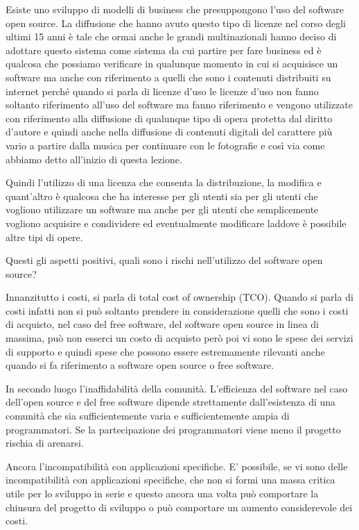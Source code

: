 Esiste uno sviluppo di modelli di business che presuppongono l'uso del software open source. 
La diffusione che hanno avuto questo tipo di licenze nel corso degli ultimi 15 anni è tale che ormai anche le grandi multinazionali hanno deciso di adottare questo sistema come sistema da cui partire per fare business ed è qualcosa che possiamo verificare in qualunque momento in cui si acquisisce un software ma anche con riferimento a quelli che sono i contenuti distribuiti su internet perché quando si parla di licenze d'uso le licenze d'uso non fanno soltanto riferimento all'uso del software ma fanno riferimento e vengono utilizzate con riferimento alla diffusione di qualunque tipo di opera protetta dal diritto d'autore e quindi anche nella diffusione di contenuti digitali del carattere più vario a partire dalla musica per continuare con le fotografie e così via come abbiamo detto all'inizio di questa lezione. 

Quindi l'utilizzo di una licenza che consenta la distribuzione, la modifica e quant'altro è qualcosa che ha interesse per gli utenti sia per gli utenti che vogliono utilizzare un software ma anche per gli utenti che semplicemente vogliono acquisire e condividere ed eventualmente modificare laddove è possibile altre tipi di opere. 

Questi gli aspetti positivi, quali sono i rischi nell'utilizzo del software open source? 


Innanzitutto i costi, si parla di total cost of ownership (TCO). Quando si parla di costi infatti non si può soltanto prendere in considerazione quelli che sono i costi di acquisto, nel caso del free software, del software open source in linea di massima, può non esserci un costo di acquisto però poi vi sono le spese dei servizi di supporto e quindi spese che possono essere estremamente rilevanti anche quando si fa riferimento a software open source o free software. 

In secondo luogo l'inaffidabilità della comunità. L'efficienza del software nel caso dell'open source e del free software dipende strettamente dall'esistenza di una comunità che sia sufficientemente varia e sufficientemente ampia di programmatori. Se la partecipazione dei programmatori viene meno il progetto rischia di arenarsi. 

Ancora l'incompatibilità con applicazioni specifiche. E' possibile, se vi sono delle incompatibilità con applicazioni specifiche, che non si formi una massa critica utile per lo sviluppo in serie e questo ancora una volta può comportare la chiusura del progetto di sviluppo o può comportare un aumento considerevole dei costi. 

